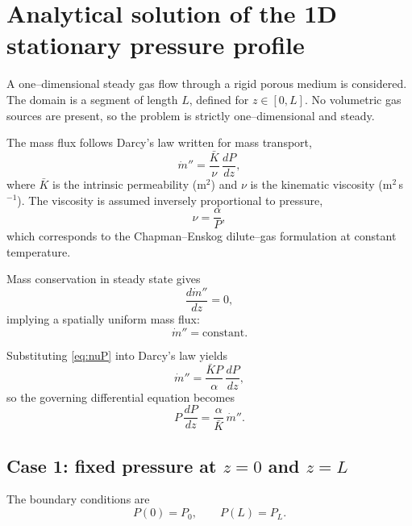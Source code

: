 \section{Analytical solution of the 1D stationary pressure profile}
\label{ann:analytical_pressure}

A one–dimensional steady gas flow through a rigid porous medium is considered.  
The domain is a segment of length $L$, defined for $z\in[0,L]$.  
No volumetric gas sources are present, so the problem is strictly one–dimensional and steady.

The mass flux follows Darcy’s law written for mass transport,
\begin{equation}
\dot{m}'' = \frac{\bar{K}}{\nu}\,\frac{dP}{dz},
\label{eq:darcy}
\end{equation}
where $\bar{K}$ is the intrinsic permeability (m$^2$) and $\nu$ is the kinematic viscosity (m$^2$\,s$^{-1}$).  
The viscosity is assumed inversely proportional to pressure,
\begin{equation}
\nu = \frac{\alpha}{P},
\label{eq:nuP}
\end{equation}
which corresponds to the Chapman--Enskog dilute–gas formulation at constant temperature.

Mass conservation in steady state gives
\begin{equation}
\frac{d\dot{m}''}{dz} = 0,
\end{equation}
implying a spatially uniform mass flux:
\begin{equation}
\dot{m}'' = \text{constant}.
\label{eq:mconst}
\end{equation}

Substituting \eqref{eq:nuP} into Darcy’s law yields
\begin{equation}
\dot{m}'' = \frac{\bar{K} P}{\alpha}\,\frac{dP}{dz},
\label{eq:darcy2}
\end{equation}
so the governing differential equation becomes
\begin{equation}
P\,\frac{dP}{dz} = \frac{\alpha}{\bar{K}}\,\dot{m}''.
\label{eq:ode}
\end{equation}

\subsection{Case 1: fixed pressure at $z=0$ and $z=L$}
\label{ann:analytical_pressure1}
The boundary conditions are
\begin{equation}
P(0)=P_0,
\qquad
P(L)=P_L .
\end{equation}

